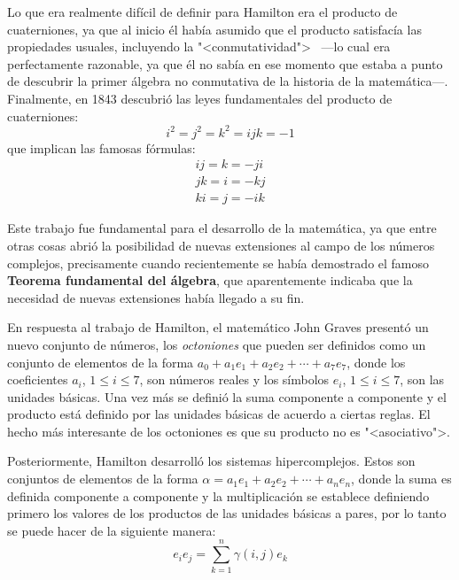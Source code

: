 \documentclass[12pt,letterpaper,titlepage]{article}
\begin{document}
Lo que era realmente difícil de definir para Hamilton era el \textsf{producto} de cuaterniones, ya que al inicio él había asumido que el producto satisfacía las propiedades usuales, incluyendo la "<conmutatividad"> ~---lo cual era perfectamente razonable, ya que él no sabía en ese momento que estaba a punto de descubrir la primer álgebra no conmutativa de la historia de la matemática---. Finalmente, en 1843 \cite[página 399]{b14}  descubrió las leyes fundamentales del producto de cuaterniones:
\begin{equation*}
i^2=j^2=k^2=ijk=-1
\end{equation*} que implican las famosas fórmulas:
\begin{eqnarray*}
ij = k = -ji \\ 
jk = i = -kj \\
ki = j = -ik 
\end{eqnarray*}


Este trabajo fue fundamental para el desarrollo de la matemática, ya que entre otras cosas abrió la posibilidad de nuevas extensiones al campo de los números complejos, precisamente cuando recientemente se había demostrado el famoso \textbf{Teorema fundamental del álgebra}, que aparentemente indicaba que la necesidad de nuevas extensiones había llegado a su fin. \bigskip

En respuesta al trabajo de Hamilton, el matemático John Graves \cite[página 126]{b1} presentó un nuevo conjunto de números, los \textit{octoniones} que pueden ser definidos como un conjunto de elementos de la forma $a_0+a_1e_1+a_2e_2+\cdots + a_7e_7$, donde los coeficientes $a_i$, $1\leq i \leq 7$, son números reales y los símbolos $e_i$, $1\leq i \leq 7$, son las unidades básicas. Una vez más se definió la suma componente a componente y el producto está definido por las unidades básicas de acuerdo a ciertas reglas. El hecho más interesante de los octoniones es que su producto no es "<asociativo">.  \bigskip

Posteriormente, Hamilton \cite[página 127]{b1} desarrolló los sistemas hipercomplejos. Estos son conjuntos de elementos de la forma $\alpha = a_1e_1+a_2e_2+\cdots + a_ne_n$, donde la suma es definida componente a componente y la multiplicación se establece definiendo primero los valores de los productos de las unidades básicas a pares, por lo tanto se puede hacer de la siguiente manera:
\begin{equation*}
e_ie_j = \sum\limits_{k=1}^{n} \gamma(i,j)e_k
\end{equation*}
\end{document}
